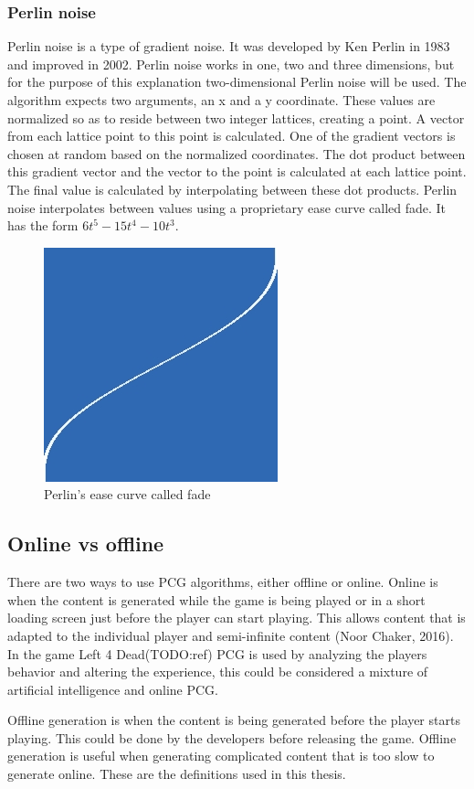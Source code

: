 		\subsubsection{Perlin noise}
		Perlin noise is a type of gradient noise. It was developed by Ken Perlin in 1983 and improved in 2002\cite{PerlinNoise}. Perlin noise works in one, two and three dimensions, but for the purpose of this explanation two-dimensional Perlin noise will be used. The algorithm expects two arguments, an x and a y coordinate. These values are normalized so as to reside between two integer lattices, creating a point. A vector from each lattice point to this point is calculated. One of the gradient vectors is chosen at random based on the normalized coordinates. The dot product between this gradient vector and the vector to the point is calculated at each lattice point. The final value is calculated by interpolating between these dot products. Perlin noise interpolates between values using a proprietary ease curve called fade. It has the form \begin{math}6t^5-15t^4-10t^3\end{math}.
		\begin{figure}
			\centering
			\includegraphics[width=0.5\linewidth]{"images/fade"}
			\caption{Perlin's ease curve called fade}
			\label{fig:fade}
		\end{figure}
	
	\subsection{Online vs offline}
	There are two ways to use PCG algorithms, either offline or online. Online is when the content is generated while the game is being played or in a short loading screen just before the player can start playing. This allows content that is adapted to the individual player and semi-infinite content (Noor Chaker, 2016). In the game Left 4 Dead(TODO:ref) PCG is used by analyzing the players behavior and altering the experience, this could be considered a mixture of artificial intelligence and online PCG.
	\par Offline generation is when the content is being generated before the player starts playing. This could be done by the developers before releasing the game. Offline generation is useful when generating complicated content that is too slow to generate online.
	These are the definitions used in this thesis.
	
